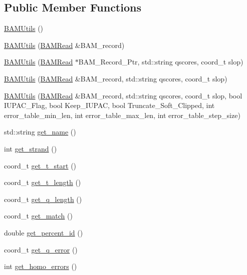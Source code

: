 \subsection*{Public Member Functions}
\begin{DoxyCompactItemize}
\item 
\hyperlink{class_b_a_m_utils_a85245410714e12d4a68bf7b2e5d5bda8}{BAMUtils} ()
\item 
\hyperlink{class_b_a_m_utils_a313b40960ee8c20c2dfee7dc85bef3eb}{BAMUtils} (\hyperlink{class_b_a_m_read}{BAMRead} \&BAM\_\-record)
\item 
\hyperlink{class_b_a_m_utils_ac2ed544597c5c23bde585a28688edef8}{BAMUtils} (\hyperlink{class_b_a_m_read}{BAMRead} $\ast$BAM\_\-Record\_\-Ptr, std::string qscores, coord\_\-t slop)
\item 
\hyperlink{class_b_a_m_utils_a3c7f88e2feab687c3d34cba5bda4284d}{BAMUtils} (\hyperlink{class_b_a_m_read}{BAMRead} \&BAM\_\-record, std::string qscores, coord\_\-t slop)
\item 
\hyperlink{class_b_a_m_utils_a146606161e6166b7ab917d9d5b220f8e}{BAMUtils} (\hyperlink{class_b_a_m_read}{BAMRead} \&BAM\_\-record, std::string qscores, coord\_\-t slop, bool IUPAC\_\-Flag, bool Keep\_\-IUPAC, bool Truncate\_\-Soft\_\-Clipped, int error\_\-table\_\-min\_\-len, int error\_\-table\_\-max\_\-len, int error\_\-table\_\-step\_\-size)
\item 
std::string \hyperlink{class_b_a_m_utils_a8428c847e49fc344ec7d117e2375a5a5}{get\_\-name} ()
\item 
int \hyperlink{class_b_a_m_utils_ac7a8be2c669ae4ade5d1f2d1809ca938}{get\_\-strand} ()
\item 
coord\_\-t \hyperlink{class_b_a_m_utils_aecf614c79eaa4cbf7402cddadf2940e9}{get\_\-t\_\-start} ()
\item 
coord\_\-t \hyperlink{class_b_a_m_utils_a6346001db742f763d1a9951c1cb24b18}{get\_\-t\_\-length} ()
\item 
coord\_\-t \hyperlink{class_b_a_m_utils_a2c1dd30d977be2b0acc93645f77388c5}{get\_\-q\_\-length} ()
\item 
coord\_\-t \hyperlink{class_b_a_m_utils_a6c833f1a68db244f92691a460b883269}{get\_\-match} ()
\item 
double \hyperlink{class_b_a_m_utils_a7e91e247baff17fd807dc490fb6a1abf}{get\_\-percent\_\-id} ()
\item 
coord\_\-t \hyperlink{class_b_a_m_utils_ab75a230cac0e5ee3ee88aa2516af5858}{get\_\-q\_\-error} ()
\item 
int \hyperlink{class_b_a_m_utils_ac7a443e44e8277f48ac5542502f92cf6}{get\_\-homo\_\-errors} ()

\end{DoxyCompactItemize}
